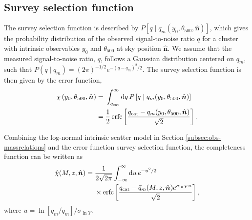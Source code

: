 \documentclass[aps,prd,twocolumn,superscriptaddress,nofootinbib,floatfix]{revtex4-2}
\begin{document}




\subsection{Survey selection function}
The survey selection function \citep{Planck2015XXIV,ZubeldiaBolliet2024} is described by
$P\left[q\mid q_m(y_0,\theta_{500},\hat{\bm n})\right]$, which gives the probability distribution of the observed signal-to-noise ratio $q$ for a cluster with intrinsic observables $y_0$ and $\theta_{500}$ at sky position $\hat{\bm n}$. We assume that the measured signal-to-noise ratio, $q$, follows a Gaussian distribution centered on $q_m$, such that $P(q\mid q_m)=(2\pi)^{-1/2}e^{-(q-q_m)^2/2}$. The survey selection function is then given by the error function,
\begin{equation}
\begin{aligned}
\chi\left(
y_0,\theta_{500},\hat{\bm n}
\right)
={}&
\int_{q_{\rm cat}}^{\infty}
\mathrm{d}q\,
P\left[
q\mid q_m(y_0,\theta_{500},\hat{\bm n})
\right]
\\
={}&
\frac{1}{2}
\operatorname{erfc}\left[
\frac{
q_{\rm cat}
-
q_m(y_0,\theta_{500},\hat{\bm n})
}
{\sqrt{2}}
\right].
\end{aligned}
\label{eq:survey_selection_function}
\end{equation}

Combining the log-normal intrinsic scatter model in Section \ref{subsec:obs-massrelations} and the error function survey selection function, the completeness function can be written as
\begin{equation}
\begin{aligned}
\hat{\chi}(M,z,\hat{\bm n})
={}&
\frac{1}{2\sqrt{2\pi}}
\int_{-\infty}^{\infty}
\mathrm{d}u\,
e^{-u^2/2}
\\
&\times
\operatorname{erfc}\left[
\frac{
q_{\rm cat}
-
\bar q_m(M,z,\hat{\bm n})
e^{\sigma_{\ln Y}u}
}
{\sqrt{2}}
\right], 
\end{aligned}
\label{eq:completeness_standard_normal}
\end{equation}
where $u=\ln[q_m/\bar q_m]/\sigma_{\ln Y}$. 
\end{document}
